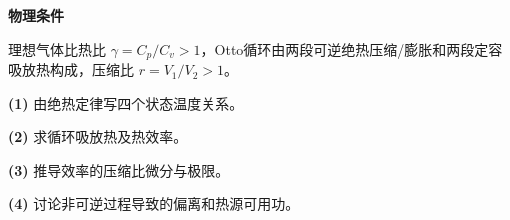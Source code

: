 \textbf{物理条件}\par 理想气体比热比 \(\gamma=C_p/C_v>1\)，Otto循环由两段可逆绝热压缩/膨胀和两段定容吸放热构成，压缩比 \(r=V_1/V_2>1\)。
\par\noindent\textbf{(1)} 由绝热定律写四个状态温度关系。
\par\noindent\textbf{(2)} 求循环吸放热及热效率。
\par\noindent\textbf{(3)} 推导效率的压缩比微分与极限。
\par\noindent\textbf{(4)} 讨论非可逆过程导致的偏离和热源可用功。
